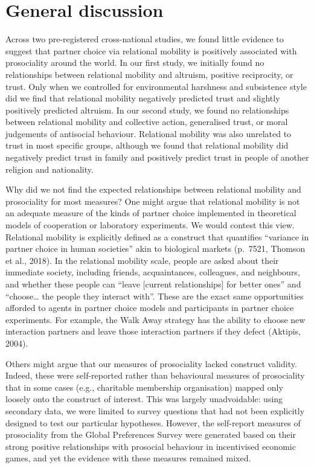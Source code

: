 \documentclass[
  man,floatsintext]{apa6}
\begin{document}
\hypertarget{general-discussion}{%
\section{General discussion}\label{general-discussion}}

Across two pre-registered cross-national studies, we found little evidence to suggest that partner choice via relational mobility is positively associated with prosociality around the world. In our first study, we initially found no relationships between relational mobility and altruism, positive reciprocity, or trust. Only when we controlled for environmental harshness and subsistence style did we find that relational mobility negatively predicted trust and slightly positively predicted altruism. In our second study, we found no relationships between relational mobility and collective action, generalised trust, or moral judgements of antisocial behaviour. Relational mobility was also unrelated to trust in most specific groups, although we found that relational mobility did negatively predict trust in family and positively predict trust in people of another religion and nationality.

Why did we not find the expected relationships between relational mobility and prosociality for most measures? One might argue that relational mobility is not an adequate measure of the kinds of partner choice implemented in theoretical models of cooperation or laboratory experiments. We would contest this view. Relational mobility is explicitly defined as a construct that quantifies ``variance in partner choice in human societies'' akin to biological markets (p.~7521, Thomson et al., 2018). In the relational mobility scale, people are asked about their immediate society, including friends, acquaintances, colleagues, and neighbours, and whether these people can ``leave {[}current relationships{]} for better ones'' and ``choose\ldots{} the people they interact with''. These are the exact same opportunities afforded to agents in partner choice models and participants in partner choice experiments. For example, the Walk Away strategy has the ability to choose new interaction partners and leave those interaction partners if they defect (Aktipis, 2004).

Others might argue that our measures of prosociality lacked construct validity. Indeed, these were self-reported rather than behavioural measures of prosociality that in some cases (e.g., charitable membership organisation) mapped only loosely onto the construct of interest. This was largely unadvoidable: using secondary data, we were limited to survey questions that had not been explicitly designed to test our particular hypotheses. However, the self-report measures of prosociality from the Global Preferences Survey were generated based on their strong positive relationships with prosocial behaviour in incentivised economic games, and yet the evidence with these measures remained mixed.
\end{document}
